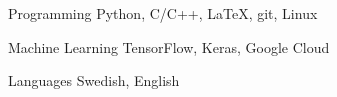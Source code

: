 


\begin{cvskills}


\cvskill
{Programming} %
{Python, C/C++, LaTeX, git, Linux} %


\cvskill
{Machine Learning } %
{TensorFlow, Keras, Google Cloud} %


\cvskill
{Languages} %
{Swedish, English } %


\end{cvskills}
